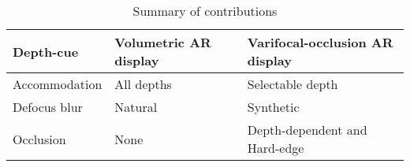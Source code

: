 \renewcommand{\arraystretch}{1.2}
\begin{table}
    \begin{center}
\begin{tabular}{|>{\centering\arraybackslash}m{3.5cm}|>{\centering\arraybackslash}m{4.0cm}|>{\centering\arraybackslash}m{5.5cm}|}
\hline
Depth-cue & Volumetric AR display & Varifocal-occlusion AR display \\
\hline
Accommodation & All depths & Selectable depth \\
\hline
Defocus blur & Natural & Synthetic \\
\hline
Occlusion & None & Depth-dependent and Hard-edge \\
\hline
\end{tabular}
    \end{center}
\caption[Summary of contributions]{Summary of contributions}
\label{tab:summary_contributions}
\end{table}
